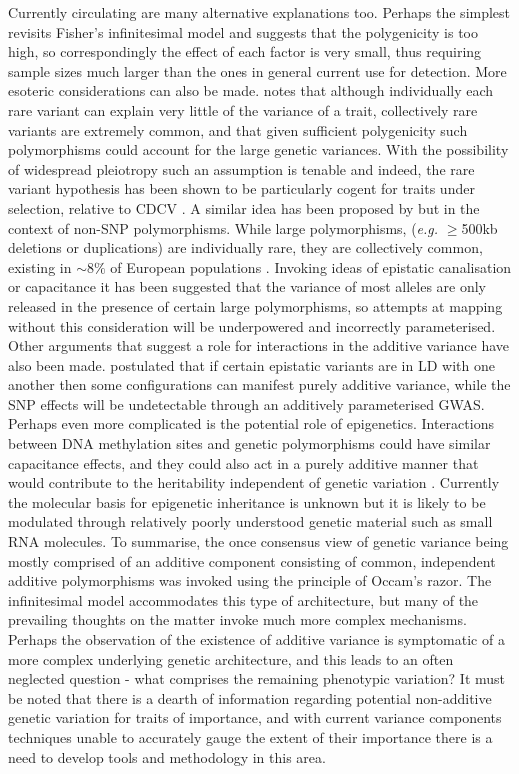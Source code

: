 Currently circulating are many alternative explanations too. Perhaps the simplest revisits Fisher's infinitesimal model \citep{Fisher1918} and suggests that the polygenicity is too high, so correspondingly the effect of each factor is very small, thus requiring sample sizes much larger than the ones in general current use for detection. More esoteric considerations can also be made. \citet{Li2008} notes that although individually each rare variant can explain very little of the variance of a trait, collectively rare variants are extremely common, and that given sufficient polygenicity such polymorphisms could account for the large genetic variances. With the possibility of widespread pleiotropy such an assumption is tenable and indeed, the rare variant hypothesis has been shown to be particularly cogent for traits under selection, relative to CDCV \citep{Eyre-Walker2010}. A similar idea has been proposed by \citet{Eichler2010} but in the context of non-SNP polymorphisms. While large polymorphisms, (\emph{e.g.} $\geq$500kb deletions or duplications) are individually rare, they are collectively common, existing in $\sim 8\%$ of European populations \citep{Itsara2009}. Invoking ideas of epistatic canalisation or capacitance \citep{Waddington1942, Bergman2003} it has been suggested that the variance of most alleles are only released in the presence of certain large polymorphisms, so attempts at mapping without this consideration will be underpowered and incorrectly parameterised. Other arguments that suggest a role for interactions in the additive variance have also been made. \citet{Haig2011} postulated that if certain epistatic variants are in LD with one another then some configurations can manifest purely additive variance, while the SNP effects will be undetectable through an additively parameterised GWAS. Perhaps even more complicated is the potential role of epigenetics. Interactions between DNA methylation sites and genetic polymorphisms could have similar capacitance effects, and they could also act in a purely additive manner that would contribute to the heritability independent of genetic variation \citep{Petronis2010}. Currently the molecular basis for epigenetic inheritance is unknown but it is likely to be modulated through relatively poorly understood genetic material such as small RNA molecules. To summarise, the once consensus view of genetic variance being mostly comprised of an additive component consisting of common, independent additive polymorphisms was invoked using the principle of Occam's razor. The infinitesimal model accommodates this type of architecture, but many of the prevailing thoughts on the matter invoke much more complex mechanisms. Perhaps the observation of the existence of additive variance is symptomatic of a more complex underlying genetic architecture, and this leads to an often neglected question - what comprises the remaining phenotypic variation? It must be noted that there is a dearth of information regarding potential non-additive genetic variation for traits of importance, and with current variance components techniques unable to accurately gauge the extent of their importance there is a need to develop tools and methodology in this area.


